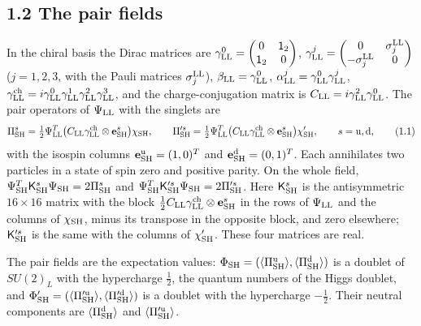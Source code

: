 \documentclass[
  10pt,
]{article}
\begin{document}
\hypertarget{the-pair-fields}{%
\subsection{1.2 The pair fields}\label{the-pair-fields}}

In the chiral basis the Dirac matrices are
\(\gamma^0_{\rm LL}=\begin{pmatrix}0&\mathsf 1_2\\\mathsf 1_2&0\end{pmatrix}\),
\(\gamma^j_{\rm LL}=\begin{pmatrix}0&\sigma^{\rm LL}_j\\-\sigma^{\rm LL}_j&0\end{pmatrix}\)
(\(j=1,2,3\), with the Pauli matrices \(\sigma^{\rm LL}_j\)),
\(\beta_{\rm LL}=\gamma^0_{\rm LL}\),
\(\alpha^j_{\rm LL}=\gamma^0_{\rm LL}\gamma^j_{\rm LL}\),
\(\gamma^{\rm ch}_{\rm LL}=i\gamma^0_{\rm LL}\gamma^1_{\rm LL}\gamma^2_{\rm LL}\gamma^3_{\rm LL}\),
and the charge-conjugation matrix is
\(C_{\rm LL}=i\gamma^2_{\rm LL}\gamma^0_{\rm LL}\). The pair operators
of \(\Psi_{\rm LL}\) with the singlets are
\[\Pi^s_{\rm SH}=\tfrac12\Psi^T_{\rm LL}\big(C_{\rm LL}\gamma^{\rm ch}_{\rm LL}\otimes\mathbf e^s_{\rm SH}\big)\chi_{\rm SH},\qquad
\Pi'^s_{\rm SH}=\tfrac12\Psi^T_{\rm LL}\big(C_{\rm LL}\gamma^{\rm ch}_{\rm LL}\otimes\mathbf e^s_{\rm SH}\big)\chi'_{\rm SH},\qquad s={\rm u},{\rm d},\tag{1.1}\]
with the isospin columns \(\mathbf e^{\rm u}_{\rm SH}=(1,0)^T\) and
\(\mathbf e^{\rm d}_{\rm SH}=(0,1)^T\). Each annihilates two particles
in a state of spin zero and positive parity. On the whole field,
\(\Psi^T_{\rm SH}\mathsf K^s_{\rm SH}\Psi_{\rm SH}=2\Pi^s_{\rm SH}\) and
\(\Psi^T_{\rm SH}\mathsf K'^s_{\rm SH}\Psi_{\rm SH}=2\Pi'^s_{\rm SH}\).
Here \(\mathsf K^s_{\rm SH}\) is the antisymmetric \(16\times16\) matrix
with the block
\(\tfrac12C_{\rm LL}\gamma^{\rm ch}_{\rm LL}\otimes\mathbf e^s_{\rm SH}\)
in the rows of \(\Psi_{\rm LL}\) and the columns of \(\chi_{\rm SH}\),
minus its transpose in the opposite block, and zero elsewhere;
\(\mathsf K'^s_{\rm SH}\) is the same with the columns of
\(\chi'_{\rm SH}\). These four matrices are real.

The pair fields are the expectation values:
\(\Phi_{\rm SH}=(\langle\Pi^{\rm u}_{\rm SH}\rangle,\langle\Pi^{\rm d}_{\rm SH}\rangle)\)
is a doublet of \(SU(2)_L\) with the hypercharge \(\tfrac12\), the
quantum numbers of the Higgs doublet, and
\(\Phi'_{\rm SH}=(\langle\Pi'^{\rm u}_{\rm SH}\rangle,\langle\Pi'^{\rm d}_{\rm SH}\rangle)\)
is a doublet with the hypercharge \(-\tfrac12\). Their neutral
components are \(\langle\Pi^{\rm d}_{\rm SH}\rangle\) and
\(\langle\Pi'^{\rm u}_{\rm SH}\rangle\).
\end{document}
